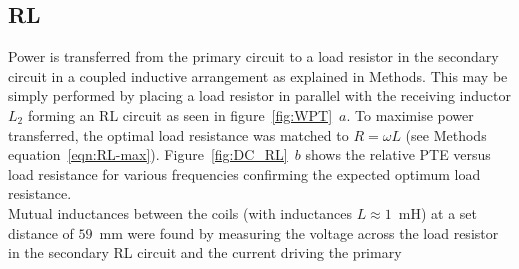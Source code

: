 \documentclass[11pt]{iopart}
\begin{document}
\subsection*{RL}
Power is transferred from the primary circuit to a load resistor in
the secondary circuit in a coupled inductive arrangement as explained
in Methods. This may be simply performed by placing a load resistor in
parallel with the receiving inductor $L_2$ forming an RL circuit as
seen in figure~\ref{fig:WPT}~$a$. To maximise power transferred, the
optimal load resistance was matched to $R = \omega L$ (see Methods
equation~\ref{eqn:RL-max}). Figure~\ref{fig:DC_RL}~$b$ shows the
relative PTE versus load resistance for various frequencies confirming
the expected optimum load resistance. \\ Mutual inductances between
the coils (with inductances $L\approx 1$~mH) at a set distance of
$59$~mm were found by measuring the voltage across the load resistor
in the secondary RL circuit and the current driving the primary
\end{document}
